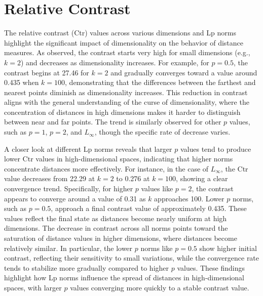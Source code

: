 \section{Relative Contrast}
The relative contrast (Ctr) values across various dimensions and Lp norms highlight
the significant impact of dimensionality on the behavior of distance measures. As
observed, the contrast starts very high for small dimensions (e.g., $k=2$) and
decreases as dimensionality increases. For example, for $p=0.5$, the contrast begins
at 27.46 for $k=2$ and gradually converges toward a value around 0.435 when $k=100$,
demonstrating that the differences between the farthest and nearest points diminish
as dimensionality increases. This reduction in contrast aligns with the general
understanding of the curse of dimensionality, where the concentration of distances
in high dimensions makes it harder to distinguish between near and far points. The
trend is similarly observed for other $p$ values, such as $p=1$, $p=2$, and $L_{\infty}$,
though the specific rate of decrease varies.

A closer look at different Lp norms reveals that larger $p$ values tend to produce lower
Ctr values in high-dimensional spaces, indicating that higher norms concentrate distances
more effectively. For instance, in the case of $L_{\infty}$, the Ctr value decreases from
22.29 at $k=2$ to 0.276 at $k=100$, showing a clear convergence trend. Specifically, for
higher $p$ values like $p=2$, the contrast appears to converge around a value of 0.31 as
$k$ approaches 100. Lower $p$ norms, such as $p=0.5$, approach a final contrast value of
approximately 0.435. These values reflect the final state as distances become nearly uniform
at high dimensions. The decrease in contrast across all norms points toward the saturation of
distance values in higher dimensions, where distances become relatively similar. In particular,
the lower $p$ norms like $p=0.5$ show higher initial contrast, reflecting their sensitivity to
small variations, while the convergence rate tends to stabilize more gradually compared to higher
$p$ values. These findings highlight how Lp norms influence the spread of distances in
high-dimensional spaces, with larger $p$ values converging more quickly to a stable contrast value.
